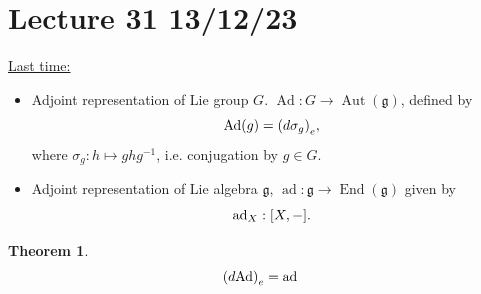 \documentclass[12pt,a4paper]{article}
\newcommand{\dg}[1]{\ensuremath{d {#1}}}
\newcommand{\lalg}{\ensuremath{\mathfrak{g}}}
\newcommand{\ul}[1]{\underline{#1}}
\newcommand{\Ad}{\ensuremath{\operatorname{Ad}}}
\newcommand{\ad}{\ensuremath{\operatorname{ad}}}
\newcommand{\adx}{\ensuremath{\operatorname{ad}_X}}
\newtheorem{thm}{Theorem}[subsubsection]
\begin{document}
\section{Lecture 31 13/12/23}
\ul{Last time:}
\begin{itemize}
\item Adjoint representation of Lie group $G$. $\Ad:G\to \operatorname{Aut}(\lalg)$, defined by 
\[\Ad(g)=\qty(\dg{\sigma_g})_e,\]
where $\sigma_g:h\mapsto ghg^{-1}$, i.e. conjugation by $g\in G$.
\item Adjoint representation of Lie algebra \lalg, $\ad:\lalg\to \operatorname{End}(\lalg)$ given by 
\[\adx:\comm{X}{-}.\]
\end{itemize}
\addtocounter{thm}{-2}
\begin{thm}
\[\qty(\dg{\Ad})_e=\ad\]
\end{thm}
\end{document}
